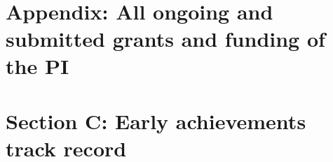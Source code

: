 \documentclass[11pt,a4paper]{article}
\begin{document}



\clearpage



~ 


\clearpage

%

\clearpage

\section*{Appendix: All ongoing and submitted grants and funding of the PI}

%

\clearpage

\section*{Section C: Early achievements track record}

%
\end{document}
